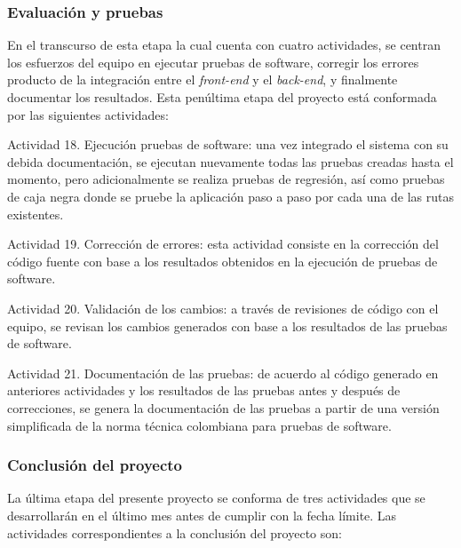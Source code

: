 \subsubsection{Evaluación y pruebas}
En el transcurso de esta etapa la cual cuenta con cuatro actividades, se centran los esfuerzos del equipo en ejecutar pruebas de software, corregir los errores producto de la integración entre el \textit{front-end} y el \textit{back-end}, y finalmente documentar los resultados. Esta penúltima etapa del proyecto está conformada por las siguientes actividades:

\begin{APAitemize}
    \item Actividad 18. Ejecución pruebas de software: una vez integrado el sistema con su debida documentación, se ejecutan nuevamente todas las pruebas creadas hasta el momento, pero adicionalmente se realiza pruebas de regresión, así como pruebas de caja negra donde se pruebe la aplicación paso a paso por cada una de las rutas existentes.
    \item Actividad 19. Corrección de errores: esta actividad consiste en la corrección del código fuente con base a los resultados obtenidos en la ejecución de pruebas de software.
    \item Actividad 20. Validación de los cambios: a través de revisiones de código con el equipo, se revisan los cambios generados con base a los resultados de las pruebas de software. 
    \item Actividad 21. Documentación de las pruebas: de acuerdo al código generado en anteriores actividades y los resultados de las pruebas antes y después de correcciones, se genera la documentación de las pruebas a partir de una versión simplificada de la norma técnica colombiana para pruebas de software.
\end{APAitemize}

\subsubsection{Conclusión del proyecto}
La última etapa del presente proyecto se conforma de tres actividades que se desarrollarán en el último mes antes de cumplir con la fecha límite. Las actividades correspondientes a la conclusión del proyecto son:

